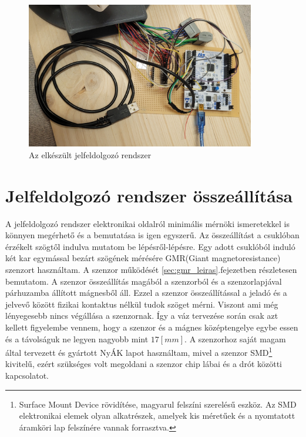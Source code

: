 \begin{figure}[!ht]
\centering
\includegraphics[width=100mm, keepaspectratio]{figures/Csuklo_szog_teszt/mikrovez_2}
\caption{Az elkészült jelfeldolgozó rendszer}
\label{fig:mikrovez_2}
\end{figure}

\section{Jelfeldolgozó rendszer összeállítása}

A jelfeldolgozó rendszer elektronikai oldalról minimális mérnöki ismeretekkel is könnyen megérhető és a bemutatása is igen egyszerű. Az összeállítást a csuklóban érzékelt szögtől indulva mutatom be lépésről-lépésre. Egy adott csuklóból induló két kar egymással bezárt szögének mérésére GMR(Giant magnetoresistance) szenzort használtam. A szenzor működését \ref{sec:gmr_leiras}.fejezetben részletesen bemutatom. A szenzor összeállítás magából a szenzorból és a szenzorlapjával párhuzamba állított mágnesből áll. Ezzel a szenzor összeállítással a jeladó és a jelvevő között fizikai kontaktus nélkül tudok szöget mérni. Viszont ami még lényegesebb nincs végállása a szenzornak. Így a váz tervezése során csak azt kellett figyelembe vennem, hogy a szenzor és a mágnes középtengelye egybe essen és a távolságuk ne legyen nagyobb mint $17[mm]$. A szenzorhoz saját magam által tervezett és gyártott NyÁK lapot használtam, mivel a szenzor SMD\footnote{ Surface Mount Device rövidítése, magyarul felszíni szerelésű eszköz. Az SMD elektronikai elemek olyan alkatrészek, amelyek kis méretűek és a nyomtatott áramköri lap felszínére vannak forrasztva.} kivitelű, ezért szükséges volt megoldani a szenzor chip lábai és a drót közötti kapcsolatot.

